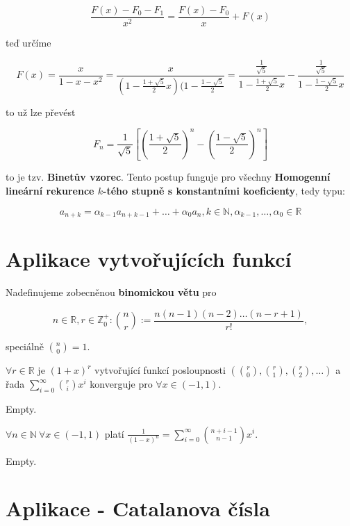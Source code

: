 $$
\frac{F(x)-F_0 - F_1}{x^2} = \frac{F(x)-F_0}{x} +F(x)
$$

teď určíme

$$
F(x) = \frac{x}{1-x-x^2} = \frac{x}{(1 - \frac{1 + \sqrt{5}}{2}x)(1 - \frac{1 - \sqrt{5}}{2}} = \frac{\frac{1}{\sqrt{5}}}{1 - \frac{1 + \sqrt{5}}{2}x} - \frac{\frac{1}{\sqrt{5}}}{1 - \frac{1 - \sqrt{5}}{2}x}
$$

to už lze převést

$$
F_n = \frac{1}{\sqrt{5}}\left[ \left( \frac{1+\sqrt{5}}{2} \right)^n - \left( \frac{1-\sqrt{5}}{2} \right)^n \right]
$$

to je tzv. \textbf{Binetův vzorec}. Tento postup funguje pro všechny \textbf{Homogenní lineární rekurence $k$-tého stupně s konstantními koeficienty}, tedy typu:

$$
a_{n+k} = \alpha_{k-1}a_{n+k-1} + \dots + \alpha_0 a_n, k \in \mathbb{N}, \alpha_{k-1}, \dots, \alpha_0 \in \mathbb{R}
$$

\section{Aplikace vytvořujících funkcí}

Nadefinujeme zobecněnou \textbf{binomickou větu} pro

$$
n \in \mathbb{R}, r \in \mathbb{Z}_{0}^{+}: \binom{n}{r}:= \frac{n(n-1)(n-2)\dots(n-r+1)}{r!},
$$

speciálně $\binom{n}{0}=1$.

\begin{veta}
	$\forall r \in \mathbb{R}$ je $(1+x)^r$ vytvořující funkcí posloupnosti $\left( \binom{r}{0}, \binom{r}{1}, \binom{r}{2}, \dots \right)$ a řada $\sum_{i=0}^{\infty}\binom{r}{i}x^{i}$ konverguje pro $\forall x \in (-1, 1)$.	
\end{veta}

\begin{dukaz}
	Empty.
\end{dukaz}

\begin{dusl}
	$\forall n \in \mathbb{N} \ \forall x \in (-1,1)$ platí $\frac{1}{(1-x)^{n}}=\sum_{i=0}^{\infty}\binom{n+i-1}{n-1} x^{i}$.
\end{dusl}

\begin{dukaz}
	Empty.
\end{dukaz}

\section{Aplikace - Catalanova čísla}

